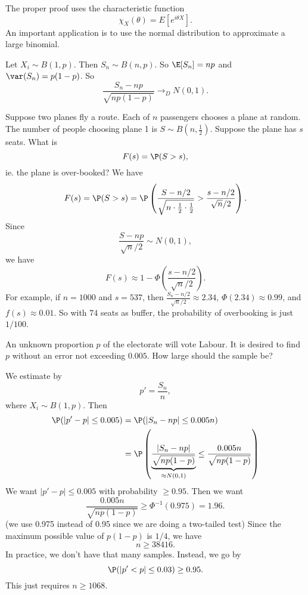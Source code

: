 \documentclass[a4paper]{article}
\begin{document}
The proper proof uses the characteristic function
\[
  \chi_X(\theta) = E[e^{i\theta X}].
\]
An important application is to use the normal distribution to approximate a large binomial.

Let $X_i \sim B(1, p)$. Then $S_n \sim B(n, p)$. So $\E[S_n] = np$ and $\var (S_n) = p(1 - p)$. So
\[
  \frac{S_n - np}{\sqrt{np(1 - p)}} \to_D N(0, 1).
\]

\begin{eg}
  Suppose two planes fly a route. Each of $n$ passengers chooses a plane at random. The number of people choosing plane 1 is $S\sim B(n, \frac{1}{2})$. Suppose the plane has $s$ seats. What is
  \[
    F(s) = \P(S > s),
  \]
  ie. the plane is over-booked? We have
  \[
    F(s) = \P(S > s) = \P\left(\frac{S - n/2}{\sqrt{n\cdot \frac{1}{2}\cdot \frac{1}{2}}} > \frac{s - n/2}{\sqrt{n}/2}\right).
  \]
  Since
  \[
    \frac{S - np}{\sqrt{n}/2}\sim N(0, 1),
  \]
  we have
  \[
    F(s) \approx 1 - \Phi\left(\frac{s - n/2}{\sqrt{n}/2}\right).
  \]
  For example, if $n = 1000$ and $s = 537$, then $\frac{S_n - n/2}{\sqrt{n}/2}\approx 2.34$, $\Phi(2.34)\approx 0.99$, and $f(s) \approx 0.01$. So with $74$ seats as buffer, the probability of overbooking is just $1/100$.
\end{eg}

\begin{eg}
  An unknown proportion $p$ of the electorate will vote Labour. It is desired to find $p$ without an error not exceeding $0.005$. How large should the sample be?

  We estimate by
  \[
    p' = \frac{S_n}{n},
  \]
  where $X_i\sim B(1, p)$. Then
  \begin{align*}
    \P(|p' - p| \leq 0.005) &= \P(|S_n - np| \leq 0.005n)\\
    &= \P\left(\underbrace{\frac{|S_n - np|}{\sqrt{np(1 - p)}}}_{\approx N(0, 1)} \leq \frac{0.005n}{\sqrt{np(1 - p)}}\right)
  \end{align*}
  We want $|p' - p| \leq 0.005$ with probability $\geq 0.95$. Then we want
  \[
    \frac{0.005n}{\sqrt{np(1 - p)}} \geq \Phi^{-1}(0.975) = 1.96.
  \]
  (we use 0.975 instead of 0.95 since we are doing a two-tailed test) Since the maximum possible value of $p(1 - p)$ is $1/4$, we have
  \[
    n \geq 38416.
  \]
  In practice, we don't have that many samples. Instead, we go by
  \[
    \P(|p' < p| \leq 0.03) \geq 0.95.
  \]
  This just requires $n \geq 1068$.
\end{eg}
\end{document}

